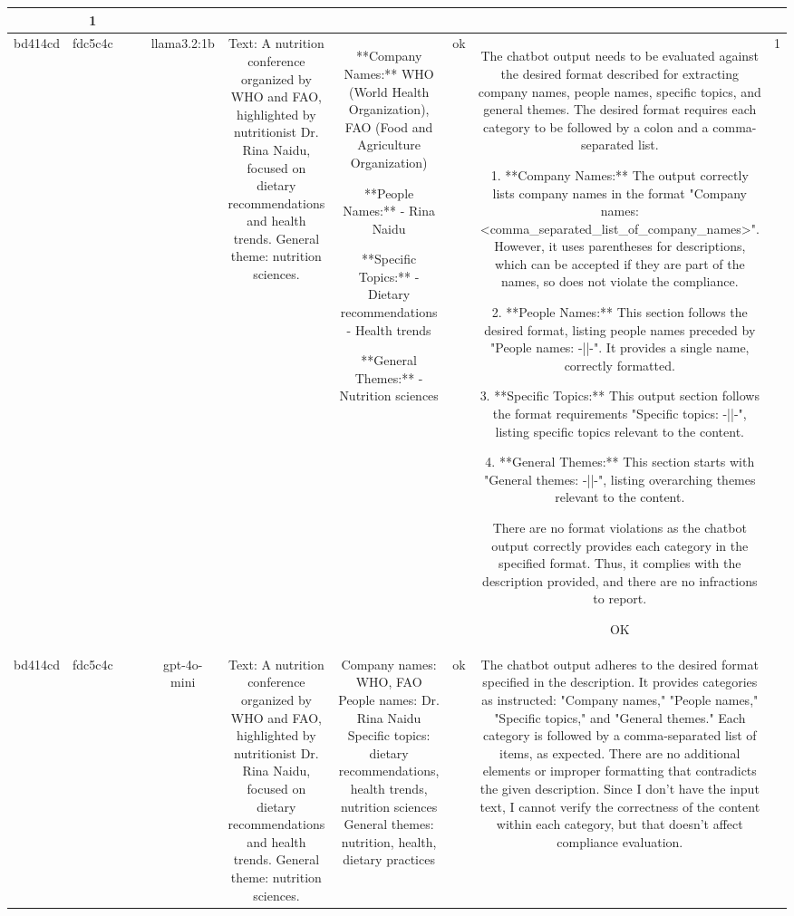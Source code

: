 \begin{table}[h!]
\begin{tabular}{|c|c|c|c|c|c|c|c|c|c|}
{OK & 1\\
\hline
bd414cd & fdc5c4c &  &  & llama3.2:1b & Text: A nutrition conference organized by WHO and FAO, highlighted by nutritionist Dr. Rina Naidu, focused on dietary recommendations and health trends. General theme: nutrition sciences. & **Company Names:** WHO (World Health Organization), FAO (Food and Agriculture Organization)

**People Names:**
- Rina Naidu

**Specific Topics:**
- Dietary recommendations
- Health trends

**General Themes:**
- Nutrition sciences & ok & The chatbot output needs to be evaluated against the desired format described for extracting company names, people names, specific topics, and general themes. The desired format requires each category to be followed by a colon and a comma-separated list.

1. **Company Names:** The output correctly lists company names in the format "Company names: <comma_separated_list_of_company_names>". However, it uses parentheses for descriptions, which can be accepted if they are part of the names, so does not violate the compliance.

2. **People Names:** This section follows the desired format, listing people names preceded by "People names: -||-". It provides a single name, correctly formatted.

3. **Specific Topics:** This output section follows the format requirements "Specific topics: -||-", listing specific topics relevant to the content.

4. **General Themes:** This section starts with "General themes: -||-", listing overarching themes relevant to the content.

There are no format violations as the chatbot output correctly provides each category in the specified format. Thus, it complies with the description provided, and there are no infractions to report.

OK & 1\\
\hline
bd414cd & fdc5c4c &  &  & gpt-4o-mini & Text: A nutrition conference organized by WHO and FAO, highlighted by nutritionist Dr. Rina Naidu, focused on dietary recommendations and health trends. General theme: nutrition sciences. & Company names: WHO, FAO  
People names: Dr. Rina Naidu  
Specific topics: dietary recommendations, health trends, nutrition sciences  
General themes: nutrition, health, dietary practices   & ok & The chatbot output adheres to the desired format specified in the description. It provides categories as instructed: "Company names," "People names," "Specific topics," and "General themes." Each category is followed by a comma-separated list of items, as expected. There are no additional elements or improper formatting that contradicts the given description. Since I don't have the input text, I cannot verify the correctness of the content within each category, but that doesn't affect compliance evaluation.

}
\end{tabular}
\end{table}
